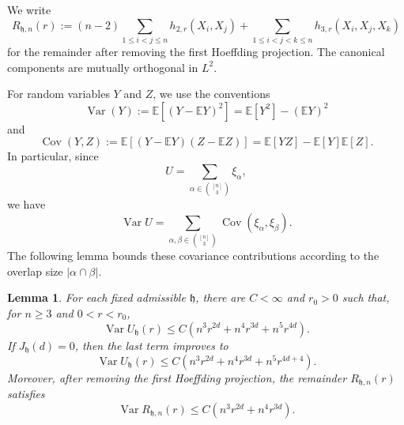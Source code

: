 \documentclass[11pt]{article}
\newtheorem{lemma}[theorem]{Lemma}
\theoremstyle{remark}
\newcommand{\E}{\mathbb E}
\numberwithin{equation}{section}
\begin{document}
We write
\[
R_{\mathfrak h,n}(r)
:=
(n-2)\sum_{1\le i<j\le n}h_{2,r}(X_i,X_j)
+
\sum_{1\le i<j<k\le n}h_{3,r}(X_i,X_j,X_k)
\]
for the remainder after removing the first Hoeffding projection.
The canonical components are mutually orthogonal in $L^2$.

For random variables $Y$ and $Z$, we use the conventions
\[
\operatorname{Var}(Y)
:=
\E\!\left[(Y-\E Y)^2\right]
=
\E[Y^2]-(\E Y)^2
\]
and
\[
\operatorname{Cov}(Y,Z)
:=
\E\!\left[(Y-\E Y)(Z-\E Z)\right]
=
\E[YZ]-\E[Y]\E[Z].
\]
In particular, since
\[
U=\sum_{\alpha\in\binom{[n]}3}\xi_\alpha,
\]
we have
\[
\operatorname{Var}U
=
\sum_{\alpha,\beta\in\binom{[n]}3}
\operatorname{Cov}(\xi_\alpha,\xi_\beta).
\]
The following lemma bounds these covariance contributions according to the
overlap size $|\alpha\cap\beta|$.

\begin{lemma}
\label{lem:statistical-overlap-bound}
For each fixed admissible $\mathfrak h$, there are $C<\infty$ and $r_0>0$
such that, for $n\ge3$ and $0<r<r_0$,
\begin{equation}
\operatorname{Var}U_{\mathfrak h}(r)
\le C\left(n^3r^{2d}+n^4r^{3d}+n^5r^{4d}\right).
\label{eq:general-U-variance}
\end{equation}
If $J_{\mathfrak h}(d)=0$, then the last term improves to
\begin{equation}
\operatorname{Var}U_{\mathfrak h}(r)
\le C\left(n^3r^{2d}+n^4r^{3d}+n^5r^{4d+4}\right).
\label{eq:zero-mass-U-variance}
\end{equation}
Moreover, after removing the first Hoeffding projection, the remainder
$R_{\mathfrak h,n}(r)$ satisfies
\begin{equation}
\operatorname{Var}R_{\mathfrak h,n}(r)
\le C\left(n^3r^{2d}+n^4r^{3d}\right).
\label{eq:Hoeffding-remainder-variance}
\end{equation}
\end{lemma}
\end{document}
